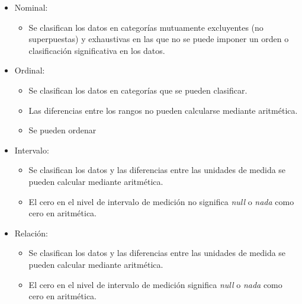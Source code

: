 \begin{itemize}
\item Nominal\cite{Yang2010}:
	\begin{itemize}
	\item Se clasifican los datos en categor\'ias mutuamente excluyentes (no superpuestas) y exhaustivas en las que no se puede imponer un orden o clasificaci\'on significativa en los datos. 
	\end{itemize}
		
\item Ordinal\cite{Yang2010}:
	\begin{itemize}
	\item Se clasifican los datos en categor\'ias que se pueden clasificar. 
	\item Las diferencias entre los rangos no pueden calcularse mediante aritm\'etica.
	\item Se pueden ordenar
	\end{itemize}		

\item Intervalo\cite{Yang2010}: 
	\begin{itemize}
	\item Se clasifican los datos y las diferencias entre las unidades de medida se pueden calcular mediante aritm\'etica. 
	\item El cero en el nivel de intervalo de medici\'on no significa \emph{null} o \emph{nada} como cero en aritm\'etica.
	\end{itemize}		

\item Relaci\'on\cite{Yang2010}:
	\begin{itemize}
	\item Se clasifican los datos y las diferencias entre las unidades de medida se pueden calcular mediante aritm\'etica. 
	\item El cero en el nivel de intervalo de medici\'on significa \emph{null} o \emph{nada} como cero en aritm\'etica.
	\end{itemize}
		
\end{itemize}